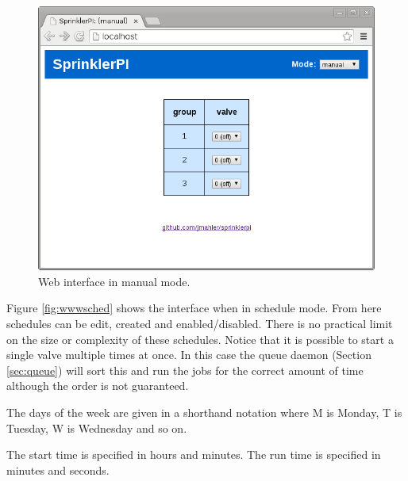 \documentclass{article}
\begin{document}
\begin{figure}[h!]
\begin{center}
\includegraphics[scale=0.50]{../testing/img/www-manual_mode.png}
\end{center}
\caption{Web interface in manual mode.}
\label{fig:wwwmanual}
\end{figure}

\clearpage
Figure \ref{fig:wwwsched} shows the interface when in schedule mode.
From here schedules can be edit, created and enabled/disabled.
There is no practical limit on the size or complexity of these
schedules.
Notice that it is possible to start a single valve multiple times
at once.
In this case the queue daemon (Section \ref{sec:queue}) will sort
this and run the jobs for the correct amount of time although the
order is not guaranteed.

The days of the week are given in a shorthand notation
where M is Monday, T is Tuesday, W is Wednesday and so on.

The start time is specified in hours and minutes.
The run time is specified in minutes and seconds.
\end{document}
